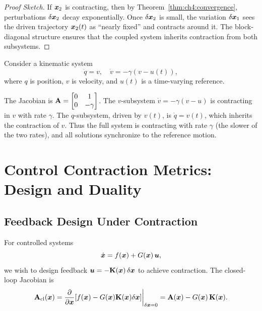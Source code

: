 \begin{proof}[Proof Sketch]
If $\bm{x}_2$ is contracting, then by Theorem~\ref{thm:ch4:convergence}, perturbations
$\delta\bm{x}_2$ decay exponentially. Once $\delta\bm{x}_2$ is small, the variation $\delta\bm{x}_1$ sees the
driven trajectory $\bm{x}_2(t)$ as ``nearly fixed'' and contracts around it. The block-diagonal
structure ensures that the coupled system inherits contraction from both subsystems.
\end{proof}

\begin{example}
Consider a kinematic system
\begin{equation}
\dot{q} = v, \quad \dot{v} = -\gamma(v - u(t)),
\label{eq:ch4:mech-example}
\end{equation}
where $q$ is position, $v$ is velocity, and $u(t)$ is a time-varying reference.

The Jacobian is $\mathbf{A} = \begin{bmatrix} 0 & 1 \\ 0 & -\gamma \end{bmatrix}$.
The $v$-subsystem $\dot{v} = -\gamma(v-u)$ is contracting in $v$ with rate $\gamma$.
The $q$-subsystem, driven by $v(t)$, is $\dot{q} = v(t)$, which inherits the contraction
of $v$. Thus the full system is contracting with rate $\gamma$ (the slower of the two rates),
and all solutions synchronize to the reference motion.
\end{example}


\section{Control Contraction Metrics: Design and Duality}

\subsection{Feedback Design Under Contraction}

For controlled systems
\begin{equation}
\dot{\bm{x}} = f(\bm{x}) + G(\bm{x})\,\bm{u},
\label{eq:ch4:controlled-system}
\end{equation}
we wish to design feedback $\bm{u} = -\mathbf{K}(\bm{x})\,\delta\bm{x}$ to achieve contraction.
The closed-loop Jacobian is
\begin{equation}
\mathbf{A}_{\text{cl}}(\bm{x}) = \frac{\partial}{\partial\bm{x}}[f(\bm{x}) - G(\bm{x})\mathbf{K}(\bm{x})\delta\bm{x}]\bigg|_{\delta\bm{x}=0}
= \mathbf{A}(\bm{x}) - G(\bm{x})\,\mathbf{K}(\bm{x}).
\label{eq:ch4:closed-loop-jacobian}
\end{equation}


